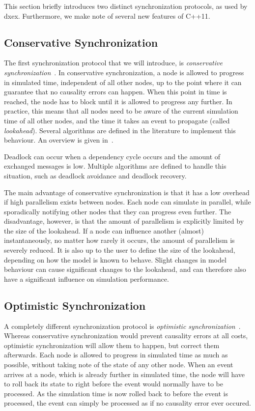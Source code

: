 This section briefly introduces two distinct synchronization protocols, as used by dxex.
Furthermore, we make note of several new features of C++11.

\subsection{Conservative Synchronization}
The first synchronization protocol that we will introduce, is \textit{conservative synchronization}~\cite{FujimotoBook}.
In conservative synchronization, a node is allowed to progress in simulated time, independent of all other nodes, up to the point where it can guarantee that no causality errors can happen.
When this point in time is reached, the node has to block until it is allowed to progress any further.
In practice, this means that all nodes need to be aware of the current simulation time of all other nodes, and the time it takes an event to propagate (called \textit{lookahead}).
Several algorithms are defined in the literature to implement this behaviour.
An overview is given in~\cite{FujimotoBook}.

Deadlock can occur when a dependency cycle occurs and the amount of exchanged messages is low.
Multiple algorithms are defined to handle this situation, such as deadlock avoidance and deadlock recovery.

The main advantage of conservative synchronization is that it has a low overhead if high parallelism exists between nodes.
Each node can simulate in parallel, while sporadically notifying other nodes that they can progress even further.
The disadvantage, however, is that the amount of parallelism is explicitly limited by the size of the lookahead.
If a node can influence another (almost) instantaneously, no matter how rarely it occurs, the amount of parallelism is severely reduced.
It is also up to the user to define the size of the lookahead, depending on how the model is known to behave.
Slight changes in model behaviour can cause significant changes to the lookahead, and can therefore also have a significant influence on simulation performance.

\subsection{Optimistic Synchronization}
A completely different synchronization protocol is \textit{optimistic synchronization}~\cite{TimeWarp}.
Whereas conservative synchronization would prevent causality errors at all costs, optimistic synchronization will allow them to happen, but correct them afterwards.
Each node is allowed to progress in simulated time as much as possible, without taking note of the state of any other node.
When an event arrives at a node, which is already further in simulated time, the node will have to roll back its state to right before the event would normally have to be processed.
As the simulation time is now rolled back to before the event is processed, the event can simply be processed as if no causality error ever occured.

